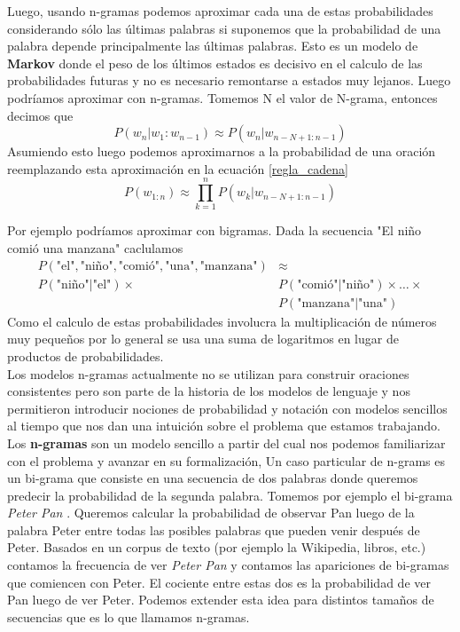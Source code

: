 \documentclass{book}
\begin{document}
Luego, usando n-gramas podemos aproximar cada una de estas probabilidades considerando sólo las últimas palabras si suponemos que la probabilidad de una palabra depende principalmente las últimas palabras. Esto es un modelo de \textbf{Markov} donde el peso de los últimos estados es decisivo en el calculo de las probabilidades futuras y no es necesario remontarse a estados muy lejanos. Luego podríamos aproximar con n-gramas. Tomemos N el valor de N-grama, entonces decimos que 
$$P(w_n|w_1:w_{n-1}) \approx P(w_n|w_{n-N+1:n-1})$$
Asumiendo esto luego podemos aproximarnos a la probabilidad de una oración reemplazando esta aproximación en la ecuación \eqref{regla_cadena}
$$P(w_{1:n})\approx \prod_{k=1}^n P(w_k|w_{n-N+1:n-1})$$

Por ejemplo podríamos aproximar con bigramas. Dada la secuencia "El niño comió una manzana" caclulamos \begin{equation}
\begin{split}
P(\text{"el"}, \text{"niño"}, \text{"comió"}, \text{"una"}, \text{"manzana"}) & \approx \\
P(\text{"niño"}|\text{"el"}) \times & P(\text{"comió"}|\text{"niño"}) \times \dots \times \\
& P(\text{"manzana"}|\text{"una"})
\end{split}
\end{equation}
Como el calculo de estas probabilidades involucra la multiplicación de números muy pequeños por lo general se usa una suma de logaritmos en lugar de productos de probabilidades. \\

Los modelos n-gramas actualmente no se utilizan para construir oraciones consistentes pero son parte de la historia de los modelos de lenguaje y nos permitieron introducir nociones de probabilidad y notación con modelos sencillos al tiempo que nos dan una intuición sobre el problema que estamos trabajando. \\

Los \textbf{n-gramas} son un modelo sencillo a partir del cual nos podemos familiarizar con el problema y avanzar en su formalización, Un caso particular de n-grams es un bi-grama que consiste en una secuencia de dos palabras donde queremos predecir la probabilidad de la segunda palabra. Tomemos por ejemplo el bi-grama \textit{Peter Pan} . Queremos calcular la probabilidad de observar Pan luego de la palabra Peter entre todas las posibles palabras que pueden venir después de Peter. Basados en un corpus de texto (por ejemplo la Wikipedia, libros, etc.) contamos la frecuencia de ver \textit{Peter Pan} y contamos las apariciones de bi-gramas que comiencen con Peter. El cociente entre estas dos es la probabilidad de ver Pan luego de ver Peter. Podemos extender esta idea para distintos tamaños de secuencias que es lo que llamamos n-gramas.\cite{jurafsky2014speech} \\
\end{document}
